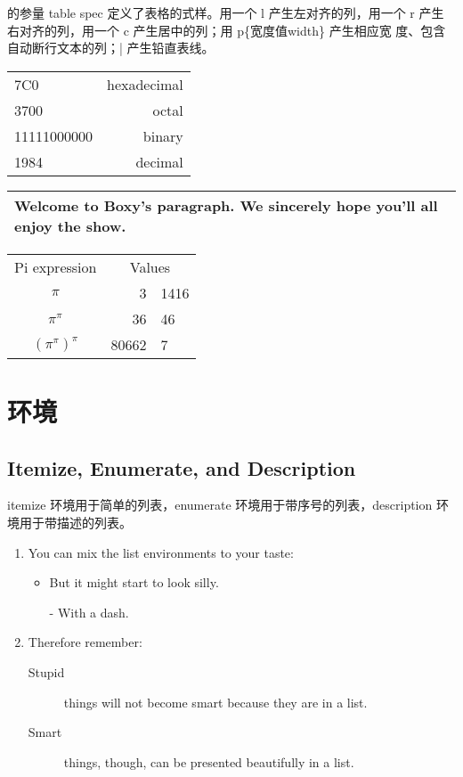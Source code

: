\documentclass{ctexart}
\begin{document}
的参量 table spec 定义了表格的式样。用一个 l 产生左对齐的列，用一个 r
产生右对齐的列，用一个 c 产生居中的列；用 p\{宽度值width\} 产生相应宽
度、包含自动断行文本的列；| 产生铅直表线。

\begin{tabular}{|l|r|}
\hline
7C0 & hexadecimal \\
3700 & octal \\ \cline{2-2}
11111000000 & binary \\
\hline \hline
1984 & decimal \\
\hline
\end{tabular}


\begin{tabular}{|p{4.7cm}|}
\hline
Welcome to Boxy’s paragraph.
We sincerely hope you’ll
all enjoy the show. \\
\hline
\end{tabular}

\begin{tabular}{|c r @{.} l|}
  \hline
  Pi expression      & \multicolumn{2}{c}{Values} \\
  $\pi$              & 3&1416 \\
  $\pi^{\pi}$        & 36&46 \\
  $(\pi^{\pi})^{\pi}$ & 80662&7 \\
  \hline
\end{tabular}

\section{环境}
\subsection{Itemize, Enumerate, and Description}
itemize 环境用于简单的列表，enumerate 环境用于带序号的列表，description
环境用于带描述的列表。
\flushleft
\begin{enumerate}
\item You can mix the list
environments to your taste:
\begin{itemize}
\item But it might start to
look silly.
\item[-] With a dash.
\end{itemize}
\item Therefore remember:
\begin{description}
\item[Stupid] things will not
become smart because they are
in a list.
\item[Smart] things, though, can be
presented beautifully in a list.
\end{description}
\end{enumerate}
\end{document}
